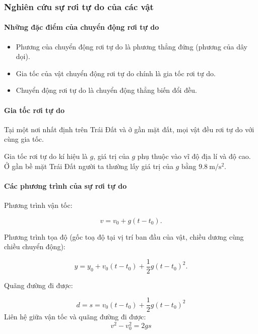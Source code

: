 \begin{tomtat}
	\subsubsection{Nghiên cứu sự rơi tự do của các vật}
	\paragraph{Những đặc điểm của chuyển động rơi tự do}
	\begin{itemize}
		\item Phương của chuyển động rơi tự do là phương thẳng đứng (phương của dây dọi).
		\item Gia tốc của vật chuyển động rơi tự do chính là gia tốc rơi tự do.
		\item Chuyển động rơi tự do là chuyển động thẳng biến đổi đều.
	\end{itemize}	
	
	\paragraph{Gia tốc rơi tự do}
	Tại một nơi nhất định trên Trái Đất và ở gần mặt đất, mọi vật đều rơi tự do với cùng gia tốc.
	
	Gia tốc rơi tự do kí hiệu là $g$, giá trị của $g$ phụ thuộc vào vĩ độ địa lí và độ cao. Ở gần bề mặt Trái Đất người ta thường lấy giá trị của $g$ bằng $\SI{9.8}{\meter/\second^2}$.
	\paragraph{Các phương trình của sự rơi tự do}
	
	Phương trình vận tốc:
	
	\begin{equation*}
		v = v_0+g(t -t_0).
	\end{equation*}
	
	Phương trình tọa độ (gốc toạ độ tại vị trí ban đầu của vật, chiều dương cùng chiều chuyển động):
	
	\begin{equation*}
		y = y_0 +v_0(t-t_0)+ \dfrac{1}{2}g(t -t_0)^2.
	\end{equation*}
	
	Quãng đường đi được:
	
	\begin{equation*}
		d= s = v_0(t-t_0)+\dfrac{1}{2} g (t-t_0)^2
	\end{equation*}
	Liên hệ giữa vận tốc và quãng đường đi được:
	$$v^2-v^2_0=2gs$$
	

\end{tomtat}
